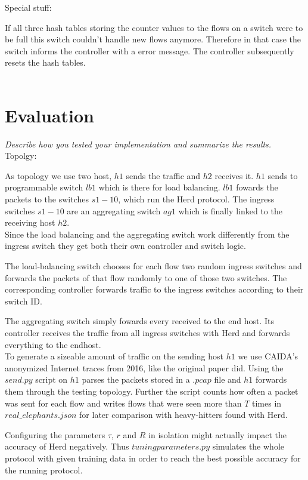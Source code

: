 \documentclass[11pt,oneside,a4paper]{article}
\newcommand{\hint}[1]{{\color{blue} \em #1}}
\begin{document}
Special stuff:

If all three hash tables storing the counter values to the flows on a switch were to be full this switch couldn't handle new flows anymore. Therefore in that case the switch informs the controller with a error message. The controller subsequently resets the hash tables. 
\\\\

\lipsum[1-5]

\section{Evaluation}
\hint{Describe how you tested your implementation and summarize the results.} \\
Topolgy:

As topology we use two host, $h1$ sends the traffic and $h2$ receives it. $h1$ sends to programmable switch $lb1$ which is there for load balancing. $lb1$ fowards the packets to the switches $s1 - 10$, which run the Herd protocol. The ingress switches $s1 - 10$ are an aggregating switch $ag1$ which is finally linked to the receiving host $h2$.\\

Since the load balancing and the aggregating switch work differently from the ingress switch they get both their own controller and switch logic.

The load-balancing switch chooses for each flow two random ingress switches and forwards the packets of that flow randomly to one of those two switches.
The corresponding controller forwards traffic to the ingress switches according to their switch ID.

The aggregating switch simply fowards every received to the end host.
Its controller receives the traffic from all ingress switches with Herd and forwards everything to the endhost.\\

To generate a sizeable amount of traffic on the sending host $h1$ we use CAIDA's anonymized Internet traces from 2016, like the original paper did. Using the $send.py$ script on $h1$ parses the packets stored in a $.pcap$ file and $h1$ forwards them through the testing topology. Further the script counts how often a packet was sent for each flow and writes flows that were seen more than $T$ times in $real\_elephants.json$ for later comparison with heavy-hitters found with Herd.

Configuring the parameters $\tau$, $r$ and $R$ in isolation might actually impact the accuracy of Herd negatively. Thus $tuningparameters.py$ simulates the whole protocol with given training data in order to reach the best possible accuracy for the running protocol.\\
\end{document}
